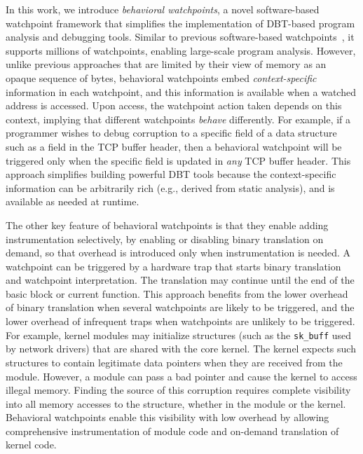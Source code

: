 In this work, we introduce \emph{behavioral watchpoints}, a novel software-based watchpoint framework that simplifies the implementation of DBT-based program analysis and debugging tools. Similar to previous software-based watchpoints~\cite{DynamoRIOWatchpoints}, it supports millions of watchpoints, enabling large-scale program analysis. However, unlike previous approaches that are limited by their view of memory as an opaque sequence of bytes, behavioral watchpoints embed \emph{context-specific} information in each watchpoint, and this information is available when a watched address is accessed. Upon access, the watchpoint action taken depends on this context, implying that different watchpoints \emph{behave} differently. For example, if a programmer wishes to debug corruption to a specific field of a data structure such as a field in the TCP buffer header, then a behavioral watchpoint will be triggered only when the specific field is updated in \emph{any} TCP buffer header. This approach simplifies building powerful DBT tools because the context-specific information can be arbitrarily rich (e.g., derived from static analysis), and is available as needed at runtime. 

The other key feature of behavioral watchpoints is that they enable adding instrumentation selectively, by enabling or disabling binary translation on demand, so that overhead is introduced only when instrumentation is needed. A watchpoint can be triggered by a hardware trap that starts binary translation and watchpoint interpretation. The translation may continue until the end of the basic block or current function. This approach benefits from the lower overhead of binary translation when several watchpoints are likely to be triggered, and the lower overhead of infrequent traps when watchpoints are unlikely to be triggered. For example, kernel modules may initialize structures (such as the \texttt{sk\_buff} used by network drivers) that are shared with the core kernel. The kernel expects such structures to contain legitimate data pointers when they are received from the module. However, a module can pass a bad pointer and cause the kernel to access illegal memory. Finding the source of this corruption requires complete visibility into all memory accesses to the structure, whether in the module or the kernel. Behavioral watchpoints enable this visibility with low overhead by allowing comprehensive instrumentation of module code and on-demand translation of kernel code. 

